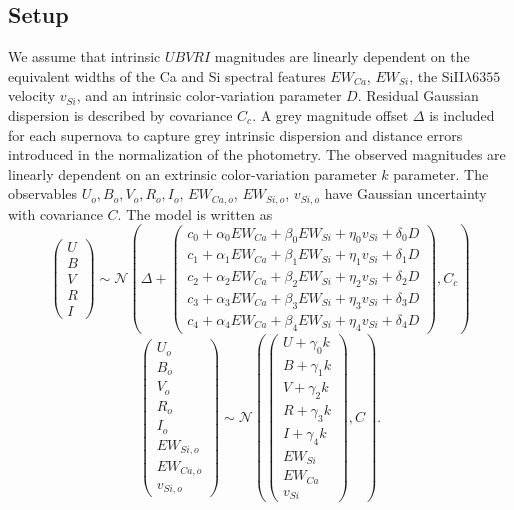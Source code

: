 \documentclass[11pt, oneside]{article}   	%
\begin{document}
\subsection{Setup}
We assume 
that  intrinsic $UBVRI$ magnitudes are linearly dependent
on the equivalent widths of the Ca and Si spectral features
$EW_{Ca}$, $EW_{Si}$,
the SiII$\lambda6355$ velocity $v_{Si}$, and an intrinsic color-variation parameter $D$.
Residual Gaussian dispersion is described by covariance $C_c$.  A grey magnitude offset $\Delta$ is included for each supernova
to capture grey intrinsic dispersion and distance errors introduced in the normalization of the photometry.
The observed magnitudes are linearly dependent on an
extrinsic color-variation parameter $k$  parameter.  The observables
$U_o, B_o, V_o, R_o, I_o$, $EW_{Ca,o}$, $EW_{Si,o}$, $v_{Si,o}$ have Gaussian uncertainty with covariance $C$.  The model is written as
\begin{equation}
\left(
\begin{matrix}
U\\B\\V\\R\\I
\end{matrix}
\right) \sim \mathcal{N}
\left(
\Delta +
\left(
\begin{matrix}
c_0+\alpha_0 EW_{Ca} + \beta_0 EW_{Si} + \eta_0 v_{Si} + \delta_0 D\\
c_1+\alpha_1 EW_{Ca} + \beta_1 EW_{Si} + \eta_1 v_{Si} + \delta_1 D \\
c_2+\alpha_2 EW_{Ca} + \beta_2 EW_{Si} + \eta_2 v_{Si} + \delta_2 D\\
c_3+\alpha_3 EW_{Ca} + \beta_3 EW_{Si} + \eta_3 v_{Si} + \delta_3 D\\
c_4+\alpha_4 EW_{Ca} + \beta_4 EW_{Si}+ \eta_4 v_{Si} + \delta_4 D
\end{matrix}
\right)
,C_{c}
\right)
\label{ewsiv:eqn}
\end{equation}
\begin{equation}
\left(
\begin{matrix}
U_o\\B_o\\ V_o\\R_o\\I_o\\EW_{Si, o}\\ EW_{Ca, o} \\ v_{Si, o}\end{matrix}
\right) \sim \mathcal{N}
\left(
\left(
\begin{matrix}
U +\gamma_0 k \\B +\gamma_1 k \\V+\gamma_2 k\\R+\gamma_3 k\\I+\gamma_4 k\\
EW_{Si}\\ EW_{Ca} \\ v_{Si}
\end{matrix}
\right)
,C
\right).
\label{dust:eqn}
\end{equation}
\end{document}
